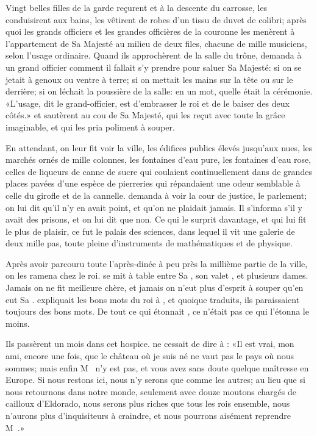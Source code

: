 {Vingt belles filles de la garde reçurent  et  à la
descente du carrosse, les conduisirent aux bains, les vêtirent de robes
d’un tissu de duvet de colibri; après quoi les grands officiers et les
grandes officières de la couronne les
menèrent à l’appartement de Sa
Majesté au milieu de deux files, chacune de mille musiciens, selon
l’usage ordinaire. Quand ils approchèrent de la salle du trône, 
demanda à un grand officier comment il fallait s’y prendre pour saluer
Sa Majesté: si on se jetait à genoux ou ventre à terre; si on mettait
les mains sur la tête ou sur le derrière; si on léchait la poussière de
la salle: en un mot, quelle était la cérémonie. «L’usage, dit le
grand-officier, est d’embrasser le roi et de le baiser des deux côtés.»
 et  sautèrent au cou de Sa Majesté, qui les reçut avec
toute la grâce imaginable, et qui les pria poliment à souper.


En attendant, on leur fit voir la ville, les édifices publics élevés
jusqu’aux nues, les marchés ornés de mille colonnes, les fontaines
d’eau pure, les fontaines d’eau rose, celles de liqueurs de canne de
sucre qui coulaient continuellement dans de grandes places pavées d’une
espèce de pierreries qui répandaient une odeur semblable à celle du
girofle et de la cannelle.  demanda à voir la cour de justice,
le parlement; on lui dit qu’il n’y en avait point, et qu’on ne plaidait
jamais. Il s’informa s’il y avait des prisons, et on lui dit que non.
Ce qui le surprit davantage, et qui lui fit le plus de plaisir, ce fut
le palais des sciences, dans lequel il vit une galerie de deux mille
pas, toute pleine d’instruments de mathématiques et de physique.}


Après avoir parcouru toute l’après-dinée à peu près la millième partie
de la ville, on les ramena chez le roi.  se mit à table entre Sa
, son valet , et plusieurs dames. Jamais on ne fit
meilleure chère, et jamais on n’eut plus d’esprit à souper qu’en eut Sa
.  expliquait les bons mots du roi à , et quoique
traduits, ils paraissaient toujours des bons mots. De tout ce qui
étonnait , ce n’était pas ce qui l’étonna le moins.

Ils passèrent un mois dans cet hospice.  ne cessait de dire à
: «Il est vrai, mon ami, encore une fois, que le château où je
suis né ne vaut pas le pays où nous sommes; mais enfin M~ n’y est pas, et vous avez sans doute quelque maîtresse en
Europe. Si nous restons ici, nous n’y serons que comme les autres; au
lieu que si nous retournons dans notre monde, seulement avec douze
moutons chargés de cailloux d’Eldorado, nous serons plus riches que
tous les rois ensemble, nous n’aurons plus d’inquisiteurs à craindre,
et nous pourrons aisément reprendre M~.»

